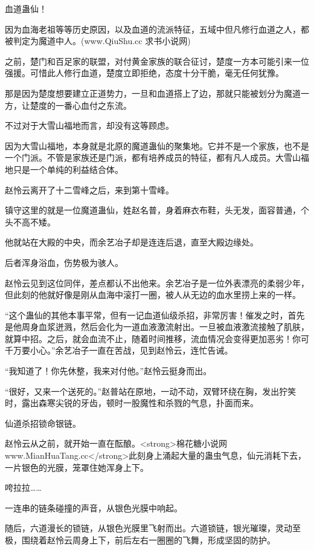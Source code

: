 
\begin{this_body}

血道蛊仙！

因为血海老祖等等历史原因，以及血道的流派特征，五域中但凡修行血道之人，都被判定为魔道中人。(www.QiuShu.cc 求书小说网)

之前，楚门和百足家的联盟，对付黄金家族的联合征讨，楚度一方本可能引来一位强援。可惜此人修行血道，楚度立即拒绝，态度十分干脆，毫无任何犹豫。

那是因为楚度想要建立正道势力，一旦和血道搭上了边，那就只能被划分为魔道一方，让楚度的一番心血付之东流。

不过对于大雪山福地而言，却没有这等顾虑。

因为大雪山福地，本身就是北原的魔道蛊仙的聚集地。它并不是一个家族，也不是一个门派。不管是家族还是门派，都有培养成员的特征，都有凡人成员。大雪山福地只是一个单纯的利益结合体。

赵怜云离开了十二雪峰之后，来到第十雪峰。

镇守这里的就是一位魔道蛊仙，姓赵名普，身着麻衣布鞋，头无发，面容普通，个头不高不矮。

他就站在大殿的中央，而余艺冶子却是连连后退，直至大殿边缘处。

后者浑身浴血，伤势极为骇人。

赵怜云见到这位同伴，差点都认不出他来。余艺冶子是一位外表漂亮的柔弱少年，但此刻的他就好像是刚从血海中滚打一圈，被人从无边的血水里捞上来的一样。

“这个蛊仙的其他本事平常，但有一记血道仙级杀招，非常厉害！催发之时，首先是他周身血浆迸溅，然后会化为一道血液激流射出。一旦被血液激流接触了肌肤，就算中招。之后，就会血流不止，随着时间推移，流血情况会变得更加恶劣！你可千万要小心。”余艺冶子一直在苦战，见到赵怜云，连忙告诫。

“我知道了！你先休整，我来对付他。”赵怜云挺身而出。

“很好，又来一个送死的。”赵普站在原地，一动不动，双臂环绕在胸，发出狞笑时，露出森寒尖锐的牙齿，顿时一股魔性和杀戮的气息，扑面而来。

仙道杀招锁命银链。

赵怜云从之前，就开始一直在酝酿。<strong>棉花糖小说网www.MianHuaTang.cc</strong>此刻身上涌起大量的蛊虫气息，仙元消耗下去，一片银色的光膜，笼罩住她浑身上下。

咵拉拉……

一连串的链条碰撞的声音，从银色光膜中响起。

随后，六道漫长的锁链，从银色光膜里飞射而出。六道锁链，银光璀璨，灵动至极，围绕着赵怜云周身上下，前后左右一圈圈的飞舞，形成坚固的防护。


\end{this_body}
